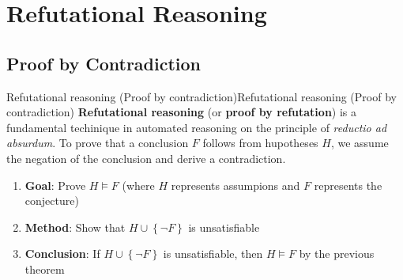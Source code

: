 \documentclass[a4paper]{article}
\theoremstyle{definition}
\begin{document}
\section{Refutational Reasoning}
\subsection{Proof by Contradiction}
\begin{definition}{Refutational reasoning (Proof by contradiction)}{Refutational reasoning (Proof by contradiction)}
\textbf{Refutational reasoning} (or \textbf{proof by refutation}) is a fundamental techinique in automated reasoning on the principle 
of \textit{reductio ad absurdum}. To prove that a conclusion \( F \) follows from hupotheses \( H \), we assume the negation of the conclusion 
and derive a contradiction.
\begin{enumerate}
	\item \textbf{Goal}: Prove \( H \models F \) (where \( H \) represents assumpions and \( F \) represents the conjecture) 
	\item \textbf{Method}: Show that \( H \cup \left\{ \lnot F \right\} \) is unsatisfiable 
	\item \textbf{Conclusion}: If \( H \cup \left\{ \lnot F \right\} \) is unsatisfiable, then \( H \models F \) by the previous theorem
\end{enumerate}
\end{definition}
\end{document}
